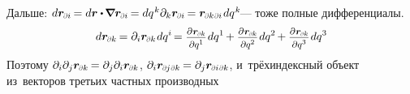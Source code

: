 \begin{otherlanguage}{russian}
Дальше:
${d\locationvector_\differentialindex{i} \hspace{-0.2ex}
= d\locationvector \dotp \hspace{-0.2ex} \boldnabla \locationvector_\differentialindex{i} \hspace{-0.2ex}
= dq^{\hspace{.1ex}k} \partial_k \locationvector_\differentialindex{i} \hspace{-0.2ex}
= \locationvector_{\differentialindex{k}\hspace{.2ex}\differentialindex{i}} \hspace{.2ex} dq^{\hspace{.1ex}k}\hspace{-0.25ex}}$\:--- тоже полные дифференциалы.
\[
d\locationvector_\differentialindex{k} \hspace{-0.2ex}
= \partial_i \locationvector_\differentialindex{k} \hspace{.15ex} dq^i \hspace{-0.3ex}
= \scalebox{0.84}{$ \displaystyle\frac{\raisemath{-0.2ex}{\partial \hspace{.1ex} \locationvector_\differentialindex{k}}}{\raisemath{-0.3ex}{\partial q^1}} $} \hspace{.2ex} dq^1 \hspace{-0.2ex}
+ \scalebox{0.84}{$ \displaystyle\frac{\raisemath{-0.2ex}{\partial \hspace{.1ex} \locationvector_\differentialindex{k}}}{\raisemath{-0.3ex}{\partial q^2}} $} \hspace{.2ex} dq^2 \hspace{-0.2ex}
+ \scalebox{0.84}{$ \displaystyle\frac{\raisemath{-0.2ex}{\partial \hspace{.1ex} \locationvector_\differentialindex{k}}}{\raisemath{-0.3ex}{\partial q^3}} $} \hspace{.2ex} dq^3 \hspace{-0.2ex}
\]
Поэтому ${\partial_i \partial_j \locationvector_\differentialindex{k} \hspace{-0.2ex} = \partial_j \partial_i \locationvector_\differentialindex{k}}$, ${\partial_i \locationvector_{\differentialindex{\hspace{-0.1ex}j}\hspace{.2ex}\differentialindex{k}} \hspace{-0.2ex} = \partial_j \locationvector_{\differentialindex{i}\hspace{.2ex}\differentialindex{k}}}$,
и~трёхиндексный объект из~векторов третьих частных производных


\end{otherlanguage}
